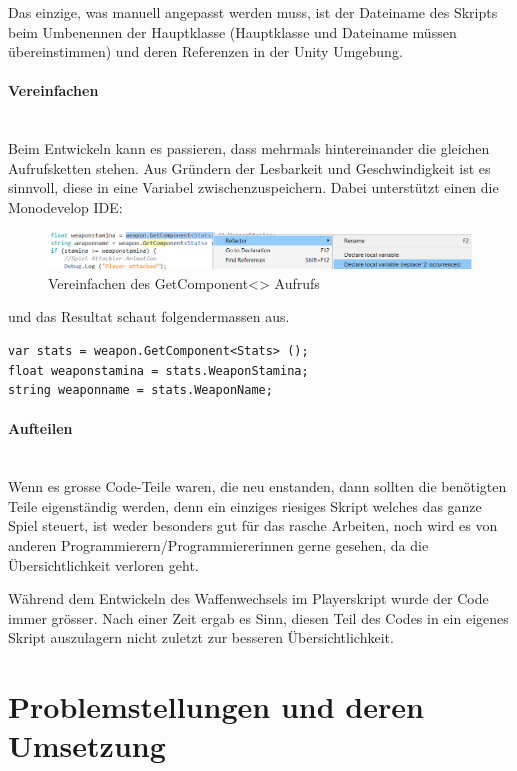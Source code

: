 Das einzige, was manuell angepasst werden muss, ist der Dateiname des Skripts beim Umbenennen der Hauptklasse (Hauptklasse und Dateiname müssen übereinstimmen) und deren Referenzen in der Unity Umgebung.

\paragraph{Vereinfachen}\mbox{} \\
Beim Entwickeln kann es passieren, dass mehrmals hintereinander die gleichen Aufrufsketten stehen. Aus Gründern der Lesbarkeit und Geschwindigkeit ist es sinnvoll, diese in eine Variabel zwischenzuspeichern. Dabei unterstützt einen die Monodevelop IDE:

\begin{figure}[H]
\includegraphics[scale=0.67]{screenshots/refactor.png}
\caption{Vereinfachen des GetComponent<> Aufrufs}
\end{figure}

und das Resultat schaut folgendermassen aus.

\begin{lstlisting}[caption={Code nach Vereinfachung}]
var stats = weapon.GetComponent<Stats> ();
float weaponstamina = stats.WeaponStamina;
string weaponname = stats.WeaponName;
\end{lstlisting}

\paragraph{Aufteilen}\mbox{} \\

Wenn es grosse Code-Teile waren, die neu enstanden, dann sollten die benötigten Teile eigenständig werden, denn ein einziges riesiges Skript welches das ganze Spiel steuert, ist weder besonders gut für das rasche Arbeiten, noch wird es von anderen Programmierern/Programmiererinnen gerne gesehen, da die Übersichtlichkeit verloren geht.

Während dem Entwickeln des Waffenwechsels im Playerskript wurde der Code immer grösser. Nach einer Zeit ergab es Sinn, diesen Teil des Codes in ein eigenes Skript auszulagern nicht zuletzt zur besseren Übersichtlichkeit.

\section{Problemstellungen und deren Umsetzung}


